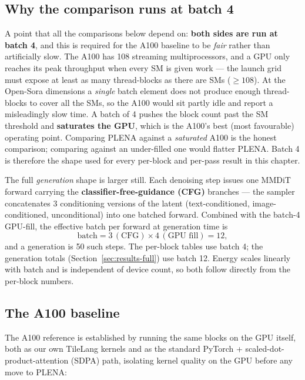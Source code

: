 \documentclass[11pt]{report}
\begin{document}
\subsection{Why the comparison runs at batch 4}
\label{sec:batch4}

A point that all the comparisons below depend on: \textbf{both sides are run
at batch 4}, and this is required for the A100 baseline to be \emph{fair}
rather than artificially slow. The A100 has 108 streaming multiprocessors,
and a GPU only reaches its peak throughput when every SM is given work ---
the launch grid must expose at least as many thread-blocks as there are SMs
($\ge 108$). At the Open-Sora dimensions a \emph{single} batch element does
not produce enough thread-blocks to cover all the SMs, so the A100 would sit
partly idle and report a misleadingly slow time. A batch of 4 pushes the
block count past the SM threshold and \textbf{saturates the GPU}, which is
the A100's best (most favourable) operating point. Comparing PLENA against a
\emph{saturated} A100 is the honest comparison; comparing against an
under-filled one would flatter PLENA. Batch 4 is therefore the shape used
for every per-block and per-pass result in this chapter.

The full \emph{generation} shape is larger still. Each denoising step issues
one MMDiT forward carrying the \textbf{classifier-free-guidance (CFG)}
branches --- the sampler concatenates 3 conditioning versions of the latent
(text-conditioned, image-conditioned, unconditional) into one batched
forward. Combined with the batch-4 GPU-fill, the effective batch per forward
at generation time is
\[
\text{batch} = 3\,(\text{CFG}) \times 4\,(\text{GPU fill}) = 12,
\]
and a generation is 50 such steps. The per-block tables use batch 4; the
generation totals (Section~\ref{sec:results-full}) use batch 12. Energy
scales linearly with batch and is independent of device count, so both
follow directly from the per-block numbers.

\subsection{The A100 baseline}
\label{sec:a100-baseline}

The A100 reference is established by running the same blocks on the GPU
itself, both as our own TileLang kernels and as the standard PyTorch +
scaled-dot-product-attention (SDPA) path, isolating kernel quality on the
GPU before any move to PLENA:
\end{document}
